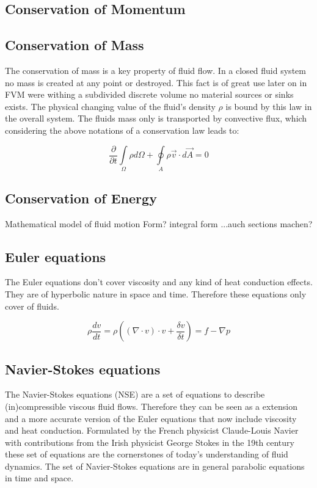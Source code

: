  

\subsection{Conservation of Momentum}



\subsection{Conservation of Mass}

The conservation of mass is a key property of fluid flow. In a closed fluid system
no mass is created at any point or destroyed. This fact is of great use later on in FVM were withing a subdivided discrete volume no material sources or sinks exists.
The physical changing value of the fluid's density $\rho$ is bound by this law in the overall system. The fluids mass only is transported by convective flux, which considering the above notations of a conservation law leads to:

\begin{equation}\label{eq:con_mass_1}
\frac {\partial}{\partial t} \int\limits_{\Omega} \rho d \Omega +
\oint\limits_{A} \rho \vec{v} \cdot d \vec{A} = 0
\end{equation}



\subsection{Conservation of Energy}





Mathematical model of fluid motion
Form? integral form ...auch sections machen?

\subsection{Euler equations}
The Euler equations don't cover viscosity and any kind of heat conduction effects. They are of hyperbolic nature in space and time. Therefore these equations only cover  of fluids.

\begin{equation}
\rho \frac{dv}{dt} = 
\rho ((\nabla \cdot v)\cdot v + \frac {\delta v}{\delta t }) =
f - \nabla p 
\end{equation}


\subsection{Navier-Stokes equations}
\label{sec:NSE_main}
The Navier-Stokes equations (NSE) are a set of equations to describe (in)compressible
viscous fluid flows. Therefore they can be seen as a extension and a more accurate version of the Euler equations that now include viscosity and heat conduction. Formulated by the French physicist Claude-Louis Navier with contributions from the Irish physicist George Stokes in the 19th century these set of equations are the cornerstones of today's understanding of fluid dynamics. The set of Navier-Stokes equations are in general parabolic equations in time and space. 

